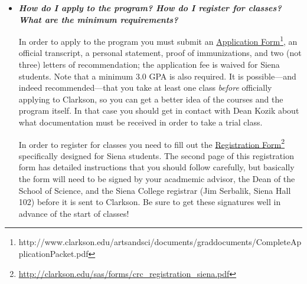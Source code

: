 \documentclass[12pt]{article}
\begin{document}
\begin{itemize}
%
  
\item{{\bf {\em How do I apply to the program?  How do I register for classes?
      What are the minimum requirements?}}

In order to apply to the program you must submit an \underline{Application
  Form}\footnote{http://www.clarkson.edu/artsandsci/documents/graddocuments/CompleteApplicationPacket.pdf},
an official transcript, a personal statement, proof of immunizations, and two
(not three) letters of recommendation; the application fee is waived for Siena
students.  Note that a minimum 3.0 GPA is also required.  It is possible---and
indeed recommended---that you take at least one class \emph{before} officially
applying to Clarkson, so you can get a better idea of the courses and the
program itself.  In that case you should get in contact with Dean Kozik about
what documentation must be received in order to take a trial class.  

In order to register for classes you need to fill out the
\underline{Registration
  Form}\footnote{\url{http://clarkson.edu/sas/forms/crc_registration_siena.pdf}}
specifically designed for Siena students.  The second page of this registration
form has detailed instructions that you should follow carefully, but basically
the form will need to be signed by your acadmemic advisor, the Dean of the
School of Science, and the Siena College registrar (Jim Serbalik, Siena Hall
102) before it is sent to Clarkson.  Be sure to get these signatures well in
advance of the start of classes!}


\end{itemize}
\end{document}
